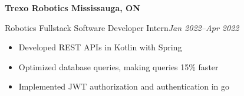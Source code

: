 \textbf{Trexo Robotics \hfill Mississauga, ON}

Robotics Fullstack Software Developer Intern\hfill \textit{Jan 2022--Apr 2022}
\begin{itemize}
    \item Developed REST APIs in Kotlin with Spring
    \item Optimized database queries, making queries 15\% faster
    \item Implemented JWT authorization and authentication in go
\end{itemize}
